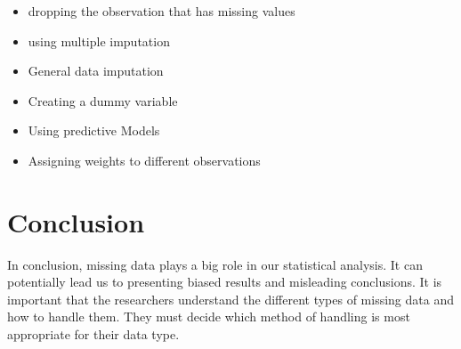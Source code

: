 \documentclass[
  letterpaper,
  DIV=11,
  numbers=noendperiod]{scrartcl}
\providecommand{\tightlist}{%
  \setlength{\itemsep}{0pt}\setlength{\parskip}{0pt}}\usepackage{longtable,booktabs,array}
\begin{document}
\begin{itemize}
\tightlist
\item
  dropping the observation that has missing values
\item
  using multiple imputation
\item
  General data imputation
\item
  Creating a dummy variable
\item
  Using predictive Models
\item
  Assigning weights to different observations
\end{itemize}

\section{Conclusion}\label{conclusion}

In conclusion, missing data plays a big role in our statistical
analysis. It can potentially lead us to presenting biased results and
misleading conclusions. It is important that the researchers understand
the different types of missing data and how to handle them. They must
decide which method of handling is most appropriate for their data type.
\end{document}
